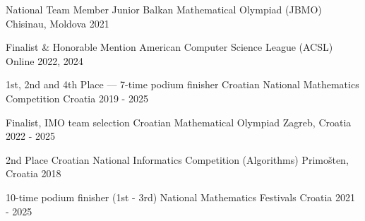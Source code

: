 %
%

\begin{cvhonors}

  \cvhonor
    {National Team Member} %
    {Junior Balkan Mathematical Olympiad (JBMO)} %
    {Chisinau, Moldova} %
    {2021} %

  \cvhonor
    {Finalist \& Honorable Mention} %
    {American Computer Science League (ACSL)} %
    {Online} %
    {2022, 2024} %

\end{cvhonors}

\begin{cvhonors}

  \cvhonor
    {1st, 2nd and 4th Place — 7-time podium finisher} %
    {Croatian National Mathematics Competition} %
    {Croatia} %
    {2019 - 2025} %

  \cvhonor
    {Finalist, IMO team selection} %
    {Croatian Mathematical Olympiad} %
    {Zagreb, Croatia} %
    {2022 - 2025} %

  \cvhonor
    {2nd Place} %
    {Croatian National Informatics Competition (Algorithms)} %
    {Primošten, Croatia} %
    {2018} %

  \cvhonor
    {10-time podium finisher (1st - 3rd)} %
    {National Mathematics Festivals} %
    {Croatia} %
    {2021 - 2025} %

\end{cvhonors}
